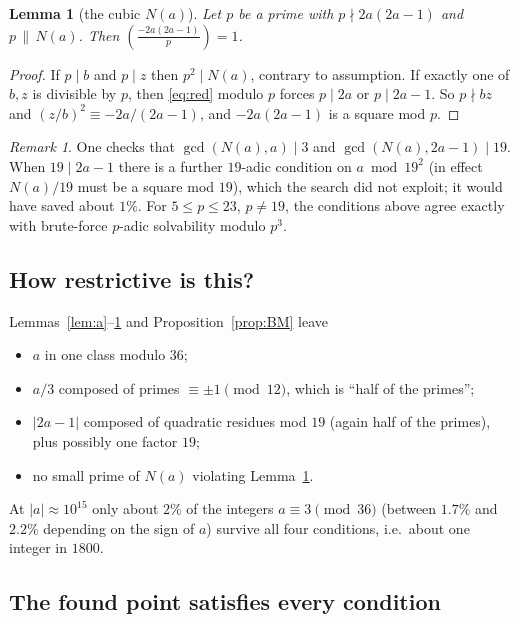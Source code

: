 \documentclass[11pt]{article}
\newtheorem{lemma}[theorem]{Lemma}
\theoremstyle{remark}
\newtheorem{remark}[theorem]{Remark}
\theoremstyle{definition}
\newcommand{\leg}[2]{\left(\frac{#1}{#2}\right)}
\begin{document}
\begin{lemma}[the cubic $N(a)$]\label{lem:N}
Let $p$ be a prime with $p\nmid 2a(2a-1)$ and $p\,\|\,N(a)$.  Then $\leg{-2a(2a-1)}{p}=1$.
\end{lemma}
\begin{proof}
If $p\mid b$ and $p\mid z$ then $p^2\mid N(a)$, contrary to assumption.  If exactly one of $b,z$ is
divisible by $p$, then \eqref{eq:red} modulo $p$ forces $p\mid 2a$ or $p\mid 2a-1$.  So $p\nmid bz$ and
$(z/b)^2\equiv -2a/(2a-1)$, and $-2a(2a-1)$ is a square mod $p$.
\end{proof}

\begin{remark}
One checks that $\gcd(N(a),a)\mid 3$ and $\gcd(N(a),2a-1)\mid 19$.  When $19\mid 2a-1$ there is a
further $19$-adic condition on $a\bmod 19^2$ (in effect $N(a)/19$ must be a square mod $19$), which
the search did not exploit; it would have saved about $1\%$.  For $5\le p\le 23$, $p\ne19$, the conditions above
agree exactly with brute-force $p$-adic solvability modulo $p^3$.
\end{remark}

\subsection*{How restrictive is this?}
Lemmas~\ref{lem:a}--\ref{lem:N} and Proposition~\ref{prop:BM} leave
\begin{itemize}
\item $a$ in one class modulo $36$;
\item $a/3$ composed of primes $\equiv\pm1\pmod{12}$, which is ``half of the primes'';
\item $|2a-1|$ composed of quadratic residues mod $19$ (again half of the primes), plus possibly
  one factor $19$;
\item no small prime of $N(a)$ violating Lemma~\ref{lem:N}.
\end{itemize}
At $|a|\approx 10^{15}$ only about $2\%$ of the integers $a\equiv3\pmod{36}$ (between $1.7\%$ and $2.2\%$ depending on the sign of $a$) survive all four
conditions, i.e.\ about one integer in $1800$.

\subsection*{The found point satisfies every condition}
\end{document}

